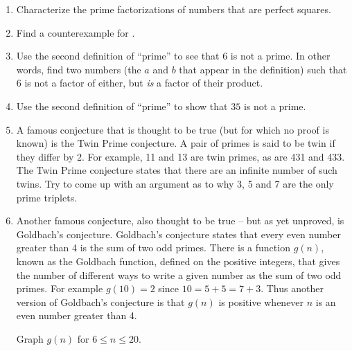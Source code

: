\begin{enumerate}
\item Characterize the prime factorizations of numbers that are
  perfect squares.

\item Find a counterexample for .

\item Use the second definition of ``prime'' to see that $6$ is
not a prime.  In other words, find two numbers (the $a$ and $b$ 
that appear in the definition) such that $6$ is not a factor of
either, but {\em is} a factor of their product.

\item Use the second definition of ``prime'' to show that $35$ is
not a prime.

\item A famous conjecture that is thought to be true (but
for which no proof is known) is the  
Twin Prime conjecture.
A pair of primes is said to be twin if they differ by 2.
For example, 11 and 13 are twin primes, as are 431 and 433.
The Twin Prime conjecture states that there are an infinite
number of such twins.  Try to come up with an argument as
to why 3, 5 and 7 are the only prime triplets.

\newpage

\item Another famous conjecture, also thought to be true -- but
as yet unproved, is 
Goldbach's conjecture.  Goldbach's conjecture
states that every even number greater than 4 is the sum of two odd
primes.  There is a function $g(n)$, known as the Goldbach function, defined
on the positive integers, that gives the number of different ways to 
write a given number as the sum of two odd primes.  For example $g(10) = 2$
since $10=5+5=7+3$.  Thus another version of Goldbach's conjecture
is that $g(n)$ is positive whenever $n$ is an even number greater than
4.

Graph $g(n)$ for $6 \leq n \leq 20$.

\end{enumerate}
